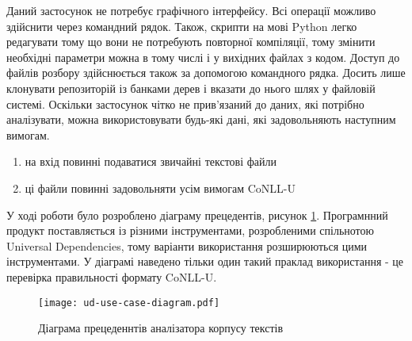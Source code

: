 Даний застосунок не потребує графічного інтерфейсу. Всі операції можливо здійснити
через командний рядок. Також, скрипти на мові Python легко редагувати тому що вони не
потребують повторної компіляції, тому змінити необхідні параметри можна в тому
числі і у вихідних файлах з кодом. Доступ до файлів розбору здійснюється
також за допомогою командного рядка. Досить лише клонувати репозиторій із
банками дерев і вказати до нього шлях у файловій системі. Оскільки застосунок
чітко не прив'язаний до даних, які потрібно аналізувати, можна використовувати будь-які
дані, які задовольняють наступним вимогам.

\begin{enumerate}
    \item на вхід повинні подаватися звичайні текстові файли
    \item ці файли повинні задовольняти усім вимогам CoNLL-U
\end{enumerate}

У ході роботи було розроблено діаграму прецедентів, рисунок \ref{img:use_case_diagram}. Програмнний продукт поставляється із різними
інструментами, розробленими спільнотою Universal Dependencies, тому
варіанти використання розширюються цими інструментами. У діаграмі наведено
тільки один такий праклад використання - це перевірка правильності формату
CoNLL-U.

\begin{figure}[p]
  \begin{center}
    \texttt{[image: ud-use-case-diagram.pdf]}
  \end{center}
  \caption{Діаграма прецеденнтів аналізатора корпусу текстів}
  \label{img:use_case_diagram}
\end{figure}
\newpage

